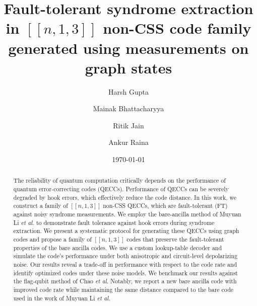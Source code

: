 \documentclass[reprint, amsmath,amssymb, aps,pra,
 floatfix,
]{revtex4-2}
\begin{document}

\title{Fault-tolerant syndrome extraction in \texorpdfstring{$[[n,1,3]]$}{[[n,1,3]]} non-CSS code family generated using measurements on graph states}

\author{Harsh Gupta}
\author{Mainak Bhattacharyya}
\author{Ritik Jain}
\author{Ankur Raina}

\date{\today}

\begin{abstract}
\noindent The reliability of quantum computation critically depends on the performance of quantum error-correcting codes (QECCs).
Performance of QECCs can be severely degraded by hook errors, which effectively reduce the code distance.
In this work, we construct a family of $[[n,1,3]]$ non-CSS QECCs, which are fault-tolerant (FT) against noisy syndrome measurements.
We employ the bare-ancilla method of Muyuan Li \emph{et al.} to demonstrate fault tolerance against hook errors during syndrome extraction.
We present a systematic protocol for generating these QECCs using graph codes and propose a family of $[[n,1,3]]$ codes that preserve the fault-tolerant properties of the bare ancilla codes.
We use a custom lookup-table decoder and simulate the code's performance under both anisotropic and circuit-level depolarizing noise.
Our results reveal a trade-off in performance with respect to the code rate and identify optimized codes under these noise models.
We benchmark our results against the flag-qubit method of Chao \emph{et al}.
Notably, we report a new bare ancilla code with improved code rate while maintaining the same distance compared to the bare code used in the work of Muyuan Li \emph{et al.}
\end{abstract}

\maketitle
\end{document}
